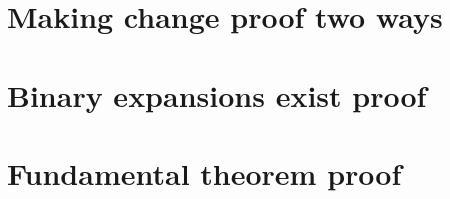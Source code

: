 
\section*{Making change proof two ways}

\vfill
\section*{Binary expansions exist proof}

\vfill
\section*{Fundamental theorem proof}

\vfill
